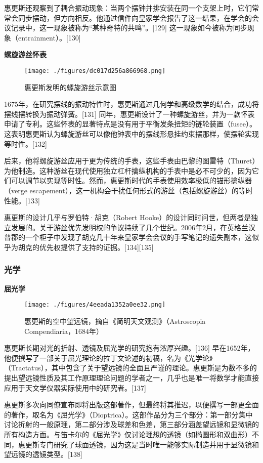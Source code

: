 惠更斯还观察到了耦合振动现象：当两个摆钟并排安装在同一个支架上时，它们常常会同步摆动，但方向相反。他通过信件向皇家学会报告了这一结果，在学会的会议记录中，这一现象被称为“某种奇特的共鸣”。[129] 这一现象如今被称为同步现象（entrainment）。[130]

\textbf{螺旋游丝怀表}
\begin{figure}[ht]
\centering
\texttt{[image: ./figures/dc017d256a866968.png]}
\caption{惠更斯发明的螺旋游丝示意图} \label{fig_HGS_12}
\end{figure}
1675年，在研究摆线的振动特性时，惠更斯通过几何学和高级数学的结合，成功将摆线摆转换为振动弹簧。[131] 同年，惠更斯设计了一种螺旋游丝，并为一款怀表申请了专利。这些怀表的显著特点是没有用于平衡发条扭矩的链轮装置（fusee）。这表明惠更斯认为螺旋游丝可以像他钟表中的摆线形悬挂约束摆那样，使摆轮实现等时性。[132]

后来，他将螺旋游丝应用于更为传统的手表，这些手表由巴黎的图雷特（Thuret）为他制造。这种游丝在现代使用独立杠杆擒纵机构的手表中是必不可少的，因为它们可以调节以实现等时性。然而，惠更斯时代的手表使用效率极低的锚形擒纵器（verge escapement），这一机构会干扰任何形式的游丝（包括螺旋游丝）的等时性能。[133]

惠更斯的设计几乎与罗伯特·胡克（Robert Hooke）的设计同时问世，但两者是独立发展的。关于游丝优先发明权的争议持续了几个世纪。2006年2月，在英格兰汉普郡的一个柜子中发现了胡克几十年来皇家学会会议的手写笔记的遗失副本，这似乎为胡克的优先权提供了支持的证据。[134][135]
\subsubsection{光学}
\textbf{屈光学}
\begin{figure}[ht]
\centering
\texttt{[image: ./figures/4eeada1352a0ee32.png]}
\caption{惠更斯的空中望远镜，摘自《简明天文观测》（Astroscopia Compendiaria，1684年）} \label{fig_HGS_13}
\end{figure}
惠更斯长期对光的折射、透镜及屈光学的研究抱有浓厚兴趣。[136] 早在1652年，他便撰写了一部关于屈光理论的拉丁文论述的初稿，名为《光学论》（Tractatus），其中包含了关于望远镜的全面且严谨的理论。惠更斯是为数不多的提出望远镜性质及其工作原理理论问题的学者之一，几乎也是唯一将数学才能直接应用于天文学仪器实际使用中的研究者。[137]

惠更斯多次向同僚宣布即将出版这部著作，但最终将其推迟，以便撰写一部更全面的著作，取名为《屈光学》（Dioptrica）。这部作品分为三个部分：第一部分集中讨论折射的一般原理，第二部分涉及球差和色差，第三部分涵盖望远镜和显微镜的所有构造方面。与笛卡尔的《屈光学》仅讨论理想的透镜（如椭圆形和双曲形）不同，惠更斯专门研究了球面透镜，因为这是当时唯一能够实际制造并用于显微镜和望远镜的透镜类型。[138]

